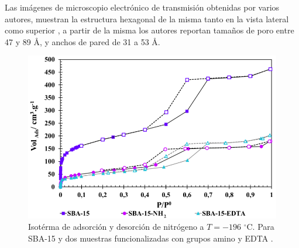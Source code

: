 \documentclass[fleqn, 12pt]{SelfArx}
\begin{document}
Las im\'agenes de microscopio electr\'onico de transmisi\'on obtenidas por varios autores, muestran la estructura hexagonal de la misma tanto en la vista lateral como superior \cite{zhao_1998}\cite{vargas_legnoverde_giraldo_basaldella_moreno-pirajan_2010}\cite{zhao_huo_feng_chmelka_stucky_1998}, a partir de la misma los autores reportan tama\~nos de poro entre 47 y 89 \r{A}, y anchos de pared de 31 a 53 \r{A}.
\begin{figure}[h]
    \centering
    \includegraphics[width=0.8\linewidth]{structures/isotherm.png}
    \caption{Isot\'erma de adsorci\'on y desorci\'on de nitr\'ogeno a $T = -196$ $^\circ$C. Para SBA-15 y dos muestras funcionalizadas con grupos amino y EDTA \cite{rodriguez}.}
    \label{fig: isoterma}
\end{figure}
\end{document}
